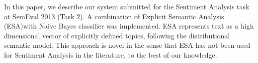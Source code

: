 In this paper, we describe our system submitted for the Sentiment Analysis task at SemEval 2013 (Task 2). A combination of Explicit Semantic
 Analysis (ESA)with Naive Bayes classifier was implemented. ESA represents text
 as a high dimensional vector of explicitly defined topics, following the
 distributional semantic model. This approach is novel in the sense that ESA has
 not been used for Sentiment Analysis in the literature, to the best of our
 knowledge.

